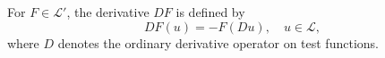 For $F \in \mathcal{L}'$, the derivative $DF$ is defined by
$$DF(u) = -F(Du), \quad u \in \mathcal{L},$$
where $D$ denotes the ordinary derivative operator on test functions.
